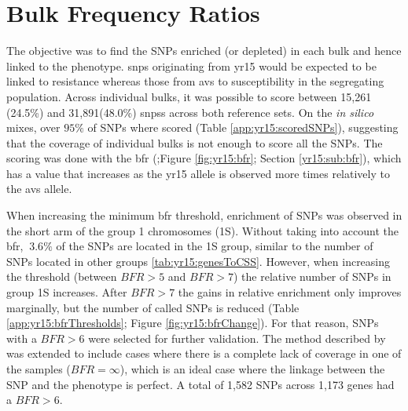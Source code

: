 \section{Bulk Frequency Ratios}
\label{sec:yr15:bfr}



The objective was to find the SNPs enriched (or depleted) in each bulk and hence linked to the phenotype.  \Glspl{snp} originating from \gls{yr15} would be expected to be linked to resistance whereas those from \acrshort{avs} to susceptibility in the segregating population. 
Across individual bulks, it was possible to score between 15,261 (24.5\%) and 31,891(48.0\%) \glspl{snp}s across both reference sets.
On the \textit{in silico} mixes, over $95\%$ of SNPs where scored (Table \ref{app:yr15:scoredSNPs}), suggesting that the coverage of individual bulks is not enough to score all the SNPs.
The scoring was done with the \acrlong{bfr} (\citealt{Trick2012};Figure \ref{fig:yr15:bfr}; Section \ref{yr15:sub:bfr}), which has a value that increases as the \acrshort{yr15} allele is observed more times relatively to the \acrshort{avs} allele.



When increasing the minimum \acrshort{bfr} threshold, enrichment of SNPs was observed in the short arm of the group 1 chromosomes (1S). 
Without taking into account the \acrshort{bfr}, $~3.6\%$ of the SNPs are located in the 1S group, similar to the number of SNPs located in other groups \ref{tab:yr15:genesToCSS}. 
However, when increasing the threshold  (between $BFR > 5 $ and $BFR > 7$) the relative number of SNPs in group 1S increases. 
After $BFR>7$ the gains in relative enrichment only improves marginally, but the number of called SNPs is reduced (Table \ref{app:yr15:bfrThresholds}; Figure \ref{fig:yr15:bfrChange}).
For that reason, SNPs with a $BFR>6$ were selected for further validation. 
The method described by \citet{Trick2012} was extended to include cases where there is a complete lack of coverage in one of the samples ($BFR=\infty$), which is an ideal case where the linkage between the SNP and the phenotype is perfect. 
A total of 1,582 SNPs across 1,173 genes had a $BFR>6$.



